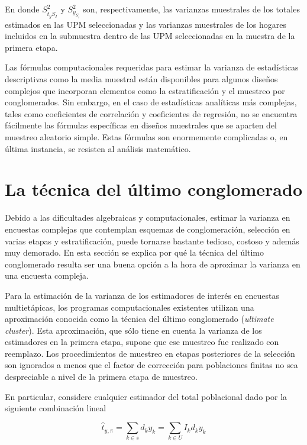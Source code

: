 \documentclass[
  12pt,
  spanish,
]{book}
\begin{document}
En donde \(S^2_{\hat{t}_{y}S_I}\) y \(S^2_{y_{S_i}}\) son, respectivamente, las varianzas muestrales de los totales estimados en las UPM seleccionadas y las varianzas muestrales de los hogares incluidos en la submuestra dentro de las UPM seleccionadas en la muestra de la primera etapa.

Las fórmulas computacionales requeridas para estimar la varianza de estadísticas descriptivas como la media muestral están disponibles para algunos diseños complejos que incorporan elementos como la estratificación y el muestreo por conglomerados. Sin embargo, en el caso de estadísticas analíticas más complejas, tales como coeficientes de correlación y coeficientes de regresión, no se encuentra fácilmente las fórmulas específicas en diseños muestrales que se aparten del muestreo aleatorio simple. Estas fórmulas son enormemente complicadas o, en última instancia, se resisten al análisis matemático.

\hypertarget{la-tuxe9cnica-del-uxfaltimo-conglomerado}{%
\section{La técnica del último conglomerado}\label{la-tuxe9cnica-del-uxfaltimo-conglomerado}}

Debido a las dificultades algebraicas y computacionales, estimar la varianza en encuestas complejas que contemplan esquemas de conglomeración, selección en varias etapas y estratificación, puede tornarse bastante tedioso, costoso y además muy demorado. En esta sección se explica por qué la técnica del último conglomerado resulta ser una buena opción a la hora de aproximar la varianza en una encuesta compleja.

Para la estimación de la varianza de los estimadores de interés en encuestas multietápicas, los programas computacionales existentes utilizan una aproximación conocida como la técnica del último conglomerado (\emph{ultimate cluster}). Esta aproximación, que sólo tiene en cuenta la varianza de los estimadores en la primera etapa, supone que ese muestreo fue realizado con reemplazo. Los procedimientos de muestreo en etapas posteriores de la selección son ignorados a menos que el factor de corrección para poblaciones finitas no sea despreciable a nivel de la primera etapa de muestreo.

En particular, considere cualquier estimador del total poblacional dado por la siguiente combinación lineal

\[
\hat{t}_{y,\pi}=\sum_{k\in s} d_k y_k = \sum_{k\in U} I_k d_k y_k 
\]
\end{document}

